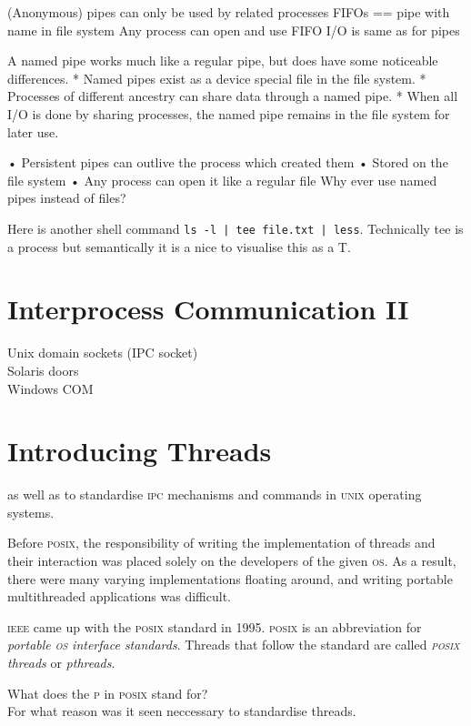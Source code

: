 (Anonymous) pipes can only be used by related 
processes
FIFOs == pipe with name in file system
Any process can open and use FIFO
I/O is same as for pipes

A named pipe works much like a regular pipe, but does have
some noticeable differences.
* Named pipes exist as a device special file in the file
system.
* Processes of different ancestry can share data through a
named pipe.
* When all I/O is done by sharing processes, the named 
pipe remains in the file system for later use.

• Persistent pipes can outlive the process which 
created them
• Stored on the file system
• Any process can open it like a regular file
 Why ever use named pipes instead of files?


\begin{example}
Here is another shell command \lstinline{ls -l | tee file.txt | less}.
Technically tee is a process but semantically it is a nice to
visualise this as a T. 
\end{example}



\section{Interprocess Communication II}

Unix domain sockets (IPC socket) \\
Solaris doors \\
Windows COM \\


\section{Introducing Threads}

as well as to standardise \textsc{ipc} mechanisms and commands 
in \textsc{unix} operating systems.

Before \textsc{posix}, the responsibility of writing the
implementation of threads and their interaction was placed 
solely on the developers of the given \textsc{os}. 
As a result, there were many varying implementations floating around, 
and writing portable multithreaded applications was difficult.

\textsc{ieee} came up with the \textsc{posix} standard in 1995. 
\textsc{posix} is an abbreviation for 
\textit{portable \textsc{os} interface standards}.
Threads that follow the standard are called 
\textit{\textsc{posix} threads} or \textit{pthreads}.

\begin{example}
What does the \textsc{p} in \textsc{posix} stand for? \\
For what reason was it seen neccessary to standardise threads.
\end{example}